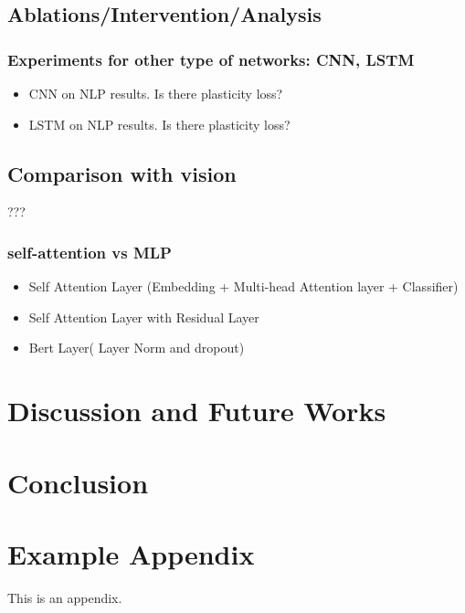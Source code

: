 \documentclass[11pt]{article}
\begin{document}

\subsection{Ablations/Intervention/Analysis}

\subsubsection{Experiments for other type of networks: CNN, LSTM}
\begin{itemize}
    \item CNN on NLP results. Is there plasticity loss?
    \item LSTM on NLP results. Is there plasticity loss?
\end{itemize}

\subsection{Comparison with vision}

??? 


\subsubsection{self-attention vs MLP}
\begin{itemize}
    \item Self Attention Layer (Embedding + Multi-head Attention layer + Classifier)
    \item Self Attention Layer  with Residual Layer
    \item Bert Layer( Layer Norm and dropout)
\end{itemize}





\section{Discussion and Future Works}


\section{Conclusion}

%


\appendix

\section{Example Appendix}
\label{sec:appendix}

This is an appendix.
\end{document}
